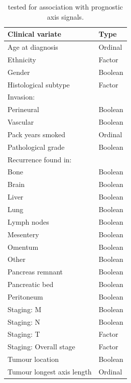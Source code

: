 \documentclass[dissertation.tex]{subfiles}
\begin{document}
\begin{table}[!htbp]
\centering
\caption{\texorpdfstring{}{CPVs} tested for association with prognostic axis signals.}\label{tab:sigs-clinvar-table}
\begin{tabular}{@{}ll@{}}
\toprule
Clinical variate           & Type    \\ \midrule
Age at diagnosis           & Ordinal \\
Ethnicity                  & Factor  \\
Gender                     & Boolean \\
Histological subtype       & Factor  \\
Invasion:                  &         \\
\quad Perineural           & Boolean \\
\quad Vascular             & Boolean \\
Pack years smoked          & Ordinal \\
Pathological grade         & Boolean \\
Recurrence found in:           &         \\
\quad Bone                       & Boolean \\
\quad Brain                      & Boolean \\
\quad Liver                      & Boolean \\
\quad Lung                       & Boolean \\
\quad Lymph nodes                & Boolean \\
\quad Mesentery                  & Boolean \\
\quad Omentum                    & Boolean \\
\quad Other                      & Boolean \\
\quad Pancreas remnant           & Boolean \\
\quad Pancreatic bed             & Boolean \\
\quad Peritoneum                 & Boolean \\
Staging: M                 & Boolean \\
Staging: N                 & Boolean \\
Staging: T                 & Factor  \\
Staging: Overall stage     & Factor  \\
Tumour location            & Boolean \\
Tumour longest axis length & Ordinal \\
\bottomrule
\end{tabular}
\end{table}
\end{document}
